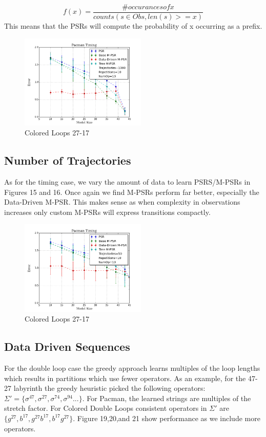 \begin{equation*}
 f(x)=\dfrac{\#occurances of x}{counts(s \in Obs, len(s)>=x)}
\end{equation*}  This means that the PSRs will compute the probability of x occurring as a prefix.

\begin{figure}[ht!]
\centering
\includegraphics[width=60mm]{uCOREPICS/DLMO/MO_1k.png}
\caption{Colored Loops 27-17\label{overflow}}
\end{figure}


\subsection{Number of Trajectories}

As for the timing case, we vary the amount of data to learn PSRS/M-PSRs in Figures 15 and 16. Once again we find M-PSRs perform far better, especially the Data-Driven M-PSR. This makes sense as when complexity in observations increases only custom M-PSRs will express transitions compactly.

\begin{figure}[ht!]
\centering
\includegraphics[width=60mm]{uCOREPICS/DLMO/MO_50.png}
\caption{Colored Loops 27-17\label{overflow}}
\end{figure}



\subsection{Data Driven Sequences}
For the double loop case the greedy approach learns multiples of the loop lengths which results in partitions which use fewer operators. As an example, for the 47-27 labyrinth the greedy heuristic picked the following operators: $\Sigma'=\{\sigma^{47}, \sigma^{27}, \sigma^{74}, \sigma^{94} ...\}$. For Pacman, the learned strings are multiples of the stretch factor. For Colored Double Loops consistent operators in $\Sigma'$ are $\{g^{27},b^{17},g^{27}b^{17},b^{17}g^{27}\}$. Figure 19,20,and 21 show performance as we include more operators.

